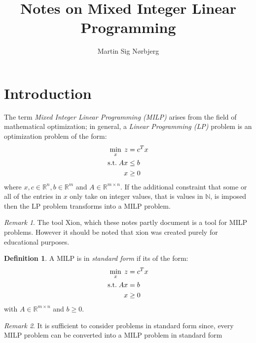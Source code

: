 \documentclass{article}
\theoremstyle{definition}
\newtheorem{definition}{Definition}[section]
\theoremstyle{remark}
\newtheorem*{remark}{Remark}
\begin{document}
\title{Notes on Mixed Integer Linear Programming}
\author{Martin Sig Nørbjerg}

\maketitle

\section{Introduction}
The term \textit{Mixed Integer Linear Programming (MILP)} arises from the field of mathematical optimization; in general, a \textit{Linear Programming (LP)} problem is an optimization problem of the form:
\begin{align*}
     \min_{x}\; z &= c^T x \\
     \textnormal{s.t.}\; Ax &\leq b\\
      x &\geq 0
\end{align*}
where $x, c \in \mathbb{R}^n, b \in \mathbb{R}^m$ and $A \in \mathbb{R}^{m \times n}$. If the additional constraint that some or all of the entries in $x$ only take on integer values, that is values in $\mathbb{N}$, is imposed then the LP problem transforms into a MILP problem.

\begin{remark}
  The tool Xion, which these notes partly document is a tool for MILP problems. However it should be noted that xion was created purely for educational purposes.
\end{remark}

\begin{definition}
  A MILP is in \textit{standard form} if its of the form:
\begin{align}
     \min_{x}\; z &= c^T x \nonumber\\
     \textnormal{s.t.}\; Ax &= b \label{eq:sf}\\
      x &\geq 0 \nonumber
\end{align}
with $A \in \mathbb{R}^{m \times n}$ and $b \geq 0$.
\end{definition}
\begin{remark}
It is sufficient to consider problems in standard form since, every MILP problem can be converted into a MILP problem in standard form
\end{remark}

\newpage
\end{document}
